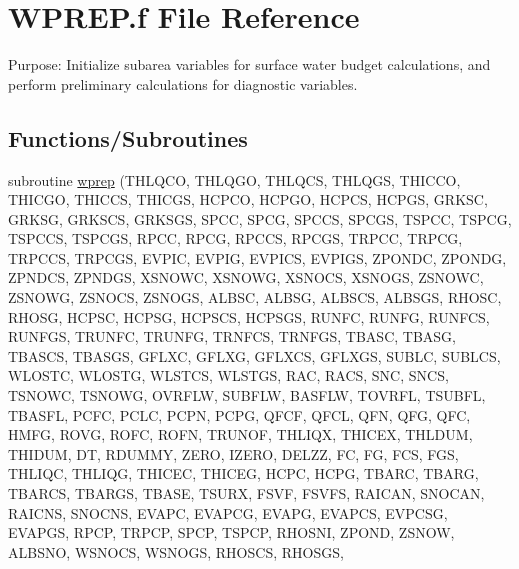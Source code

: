 \hypertarget{WPREP_8f}{}\section{W\+P\+R\+E\+P.\+f File Reference}
\label{WPREP_8f}


Purpose\+: Initialize subarea variables for surface water budget calculations, and perform preliminary calculations for diagnostic variables.  


\subsection*{Functions/\+Subroutines}
\begin{DoxyCompactItemize}
\item 
subroutine \hyperlink{WPREP_8f_a8bd6e495bd4674e569184609d67fa736}{wprep} (T\+H\+L\+Q\+C\+O, T\+H\+L\+Q\+G\+O, T\+H\+L\+Q\+C\+S, T\+H\+L\+Q\+G\+S, T\+H\+I\+C\+C\+O, T\+H\+I\+C\+G\+O, T\+H\+I\+C\+C\+S, T\+H\+I\+C\+G\+S, H\+C\+P\+C\+O, H\+C\+P\+G\+O, H\+C\+P\+C\+S, H\+C\+P\+G\+S, G\+R\+K\+S\+C, G\+R\+K\+S\+G, G\+R\+K\+S\+C\+S, G\+R\+K\+S\+G\+S, S\+P\+C\+C, S\+P\+C\+G, S\+P\+C\+C\+S, S\+P\+C\+G\+S, T\+S\+P\+C\+C, T\+S\+P\+C\+G, T\+S\+P\+C\+C\+S, T\+S\+P\+C\+G\+S, R\+P\+C\+C, R\+P\+C\+G, R\+P\+C\+C\+S, R\+P\+C\+G\+S, T\+R\+P\+C\+C, T\+R\+P\+C\+G, T\+R\+P\+C\+C\+S, T\+R\+P\+C\+G\+S, E\+V\+P\+I\+C, E\+V\+P\+I\+G, E\+V\+P\+I\+C\+S, E\+V\+P\+I\+G\+S, Z\+P\+O\+N\+D\+C, Z\+P\+O\+N\+D\+G, Z\+P\+N\+D\+C\+S, Z\+P\+N\+D\+G\+S, X\+S\+N\+O\+W\+C, X\+S\+N\+O\+W\+G, X\+S\+N\+O\+C\+S, X\+S\+N\+O\+G\+S, Z\+S\+N\+O\+W\+C, Z\+S\+N\+O\+W\+G, Z\+S\+N\+O\+C\+S, Z\+S\+N\+O\+G\+S, A\+L\+B\+S\+C, A\+L\+B\+S\+G, A\+L\+B\+S\+C\+S, A\+L\+B\+S\+G\+S, R\+H\+O\+S\+C, R\+H\+O\+S\+G, H\+C\+P\+S\+C, H\+C\+P\+S\+G, H\+C\+P\+S\+C\+S, H\+C\+P\+S\+G\+S, R\+U\+N\+F\+C, R\+U\+N\+F\+G, R\+U\+N\+F\+C\+S, R\+U\+N\+F\+G\+S, T\+R\+U\+N\+F\+C, T\+R\+U\+N\+F\+G, T\+R\+N\+F\+C\+S, T\+R\+N\+F\+G\+S, T\+B\+A\+S\+C, T\+B\+A\+S\+G, T\+B\+A\+S\+C\+S, T\+B\+A\+S\+G\+S, G\+F\+L\+X\+C, G\+F\+L\+X\+G, G\+F\+L\+X\+C\+S, G\+F\+L\+X\+G\+S, S\+U\+B\+L\+C, S\+U\+B\+L\+C\+S, W\+L\+O\+S\+T\+C, W\+L\+O\+S\+T\+G, W\+L\+S\+T\+C\+S, W\+L\+S\+T\+G\+S, R\+A\+C, R\+A\+C\+S, S\+N\+C, S\+N\+C\+S, T\+S\+N\+O\+W\+C, T\+S\+N\+O\+W\+G, O\+V\+R\+F\+L\+W, S\+U\+B\+F\+L\+W, B\+A\+S\+F\+L\+W, T\+O\+V\+R\+F\+L, T\+S\+U\+B\+F\+L, T\+B\+A\+S\+F\+L, P\+C\+F\+C, P\+C\+L\+C, P\+C\+P\+N, P\+C\+P\+G, Q\+F\+C\+F, Q\+F\+C\+L, Q\+F\+N, Q\+F\+G, Q\+F\+C, H\+M\+F\+G, R\+O\+V\+G, R\+O\+F\+C, R\+O\+F\+N, T\+R\+U\+N\+O\+F, T\+H\+L\+I\+Q\+X, T\+H\+I\+C\+E\+X, T\+H\+L\+D\+U\+M, T\+H\+I\+D\+U\+M, D\+T, R\+D\+U\+M\+M\+Y, Z\+E\+R\+O, I\+Z\+E\+R\+O, D\+E\+L\+Z\+Z, F\+C, F\+G, F\+C\+S, F\+G\+S, T\+H\+L\+I\+Q\+C, T\+H\+L\+I\+Q\+G, T\+H\+I\+C\+E\+C, T\+H\+I\+C\+E\+G, H\+C\+P\+C, H\+C\+P\+G, T\+B\+A\+R\+C, T\+B\+A\+R\+G, T\+B\+A\+R\+C\+S, T\+B\+A\+R\+G\+S, T\+B\+A\+S\+E, T\+S\+U\+R\+X, F\+S\+V\+F, F\+S\+V\+F\+S, R\+A\+I\+C\+A\+N, S\+N\+O\+C\+A\+N, R\+A\+I\+C\+N\+S, S\+N\+O\+C\+N\+S, E\+V\+A\+P\+C, E\+V\+A\+P\+C\+G, E\+V\+A\+P\+G, E\+V\+A\+P\+C\+S, E\+V\+P\+C\+S\+G, E\+V\+A\+P\+G\+S, R\+P\+C\+P, T\+R\+P\+C\+P, S\+P\+C\+P, T\+S\+P\+C\+P, R\+H\+O\+S\+N\+I, Z\+P\+O\+N\+D, Z\+S\+N\+O\+W, A\+L\+B\+S\+N\+O, W\+S\+N\+O\+C\+S, W\+S\+N\+O\+G\+S, R\+H\+O\+S\+C\+S, R\+H\+O\+S\+G\+S, 
\end{DoxyCompactItemize}
